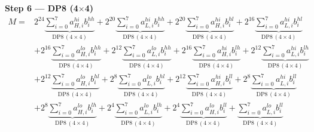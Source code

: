 \documentclass[fleqn]{article}
\newcommand{\DPop}[3]{\mathrm{DP#1}\,(#2\!\times\!#3)}
\begin{document}
\textbf{Step 6 --- DP8 (4$\times$4)}
\begin{align*}
M = {}
  & 2^{24}\underbrace{\sum_{i=0}^{7} a_{H,i}^{hi} b_i^{hh}}_{\DPop{8}{4}{4}}
  + 2^{20}\underbrace{\sum_{i=0}^{7} a_{L,i}^{hi} b_i^{hh}}_{\DPop{8}{4}{4}}
  + 2^{20}\underbrace{\sum_{i=0}^{7} a_{H,i}^{hi} b_i^{hl}}_{\DPop{8}{4}{4}}
  + 2^{16}\underbrace{\sum_{i=0}^{7} a_{L,i}^{hi} b_i^{hl}}_{\DPop{8}{4}{4}} \\[0.6em]
  & + 2^{16}\underbrace{\sum_{i=0}^{7} a_{H,i}^{lo} b_i^{hh}}_{\DPop{8}{4}{4}}
  + 2^{12}\underbrace{\sum_{i=0}^{7} a_{L,i}^{lo} b_i^{hh}}_{\DPop{8}{4}{4}}
  + 2^{16}\underbrace{\sum_{i=0}^{7} a_{H,i}^{hi} b_i^{lh}}_{\DPop{8}{4}{4}}
  + 2^{12}\underbrace{\sum_{i=0}^{7} a_{L,i}^{hi} b_i^{lh}}_{\DPop{8}{4}{4}} \\[0.6em]
  & + 2^{12}\underbrace{\sum_{i=0}^{7} a_{H,i}^{lo} b_i^{hl}}_{\DPop{8}{4}{4}}
  + 2^{8}\underbrace{\sum_{i=0}^{7} a_{L,i}^{lo} b_i^{hl}}_{\DPop{8}{4}{4}}
  + 2^{12}\underbrace{\sum_{i=0}^{7} a_{H,i}^{hi} b_i^{ll}}_{\DPop{8}{4}{4}}
  + 2^{8}\underbrace{\sum_{i=0}^{7} a_{L,i}^{hi} b_i^{ll}}_{\DPop{8}{4}{4}} \\[0.6em]
  & + 2^{8}\underbrace{\sum_{i=0}^{7} a_{H,i}^{lo} b_i^{lh}}_{\DPop{8}{4}{4}}
  + 2^{4}\underbrace{\sum_{i=0}^{7} a_{L,i}^{lo} b_i^{lh}}_{\DPop{8}{4}{4}}
  + 2^{4}\underbrace{\sum_{i=0}^{7} a_{H,i}^{lo} b_i^{ll}}_{\DPop{8}{4}{4}}
  + \underbrace{\sum_{i=0}^{7} a_{L,i}^{lo} b_i^{ll}}_{\DPop{8}{4}{4}}
\end{align*}
\end{document}
